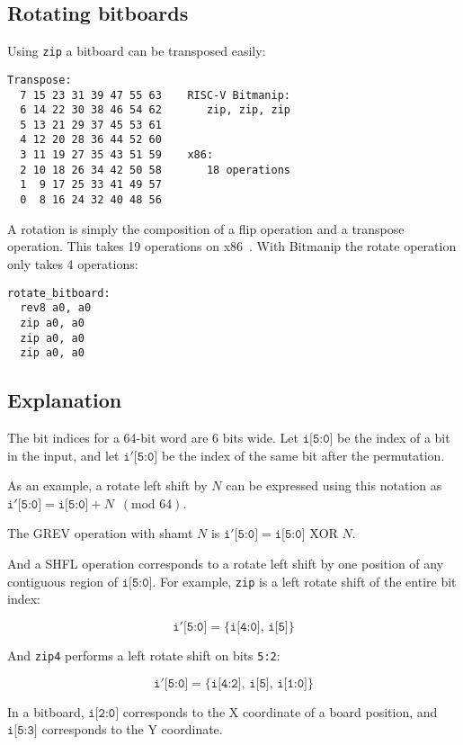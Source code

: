 \subsection{Rotating bitboards}

Using {\tt zip} a bitboard can be transposed easily:
\label{transposebitboard}

\begin{verbatim}
Transpose:
  7 15 23 31 39 47 55 63    RISC-V Bitmanip:
  6 14 22 30 38 46 54 62       zip, zip, zip
  5 13 21 29 37 45 53 61
  4 12 20 28 36 44 52 60
  3 11 19 27 35 43 51 59    x86:
  2 10 18 26 34 42 50 58       18 operations
  1  9 17 25 33 41 49 57
  0  8 16 24 32 40 48 56
\end{verbatim}

A rotation is simply the composition of a flip operation and a transpose
operation. This takes 19 operations on x86~\cite{ChessProg}. With Bitmanip
the rotate operation only takes 4 operations:

\begin{verbatim}
rotate_bitboard:
  rev8 a0, a0
  zip a0, a0
  zip a0, a0
  zip a0, a0
\end{verbatim}

\subsection{Explanation}

The bit indices for a 64-bit word are 6 bits wide. Let $\texttt{i[5:0]}$ be the
index of a bit in the input, and let $\texttt{i$'$[5:0]}$ be the index of the
same bit after the permutation.

As an example, a rotate left shift by $N$ can be expressed using this notation
as $\texttt{i$'$[5:0]} = \texttt{i[5:0]} + N \,\,\, (\textrm{mod 64})$.

The GREV operation with shamt $N$ is $\texttt{i$'$[5:0]} = \texttt{i[5:0]} \textrm{ XOR } N$.

And a SHFL operation corresponds to a rotate left shift by one position of any
contiguous region of $\texttt{i[5:0]}$. For example, {\tt zip} is a left rotate shift
of the entire bit index:

$$\texttt{i$'$[5:0]} = \{ \texttt{i[4:0]},\, \texttt{i[5]} \}$$

And {\tt zip4} performs a left rotate shift on bits {\tt 5:2}:

$$\texttt{i$'$[5:0]} = \{ \texttt{i[4:2]},\, \texttt{i[5]},\, \texttt{i[1:0]} \}$$

In a bitboard, $\texttt{i[2:0]}$ corresponds to the X coordinate of a board position, and
$\texttt{i[5:3]}$ corresponds to the Y coordinate.

